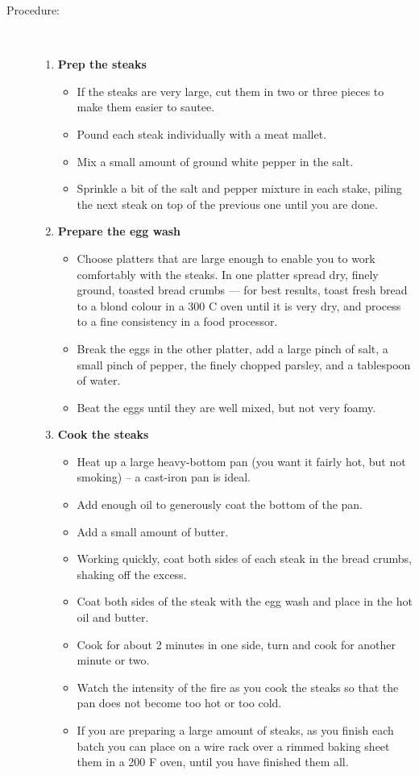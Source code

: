 \documentclass[11pt,letterpaper]{article}
\begin{document}
\begin{description}
\item[Procedure:]\ \\
	\begin{enumerate}
	\item {\bf Prep the steaks}
	\begin{itemize}
	\item If the steaks are very large, cut them in two or three pieces to make them easier to sautee.
	\item Pound each steak individually with a meat mallet.
	\item Mix a small amount of ground white pepper in the salt.
	\item Sprinkle a bit of the salt and pepper mixture in each stake, piling the next steak on top of the previous one until you are done.
	\end{itemize}
	\item {\bf Prepare the egg wash}
	\begin{itemize}
	\item Choose platters that are large enough to enable you to work comfortably with the steaks. In one platter spread dry, finely ground, toasted bread crumbs --- for best results, toast fresh bread to a blond colour in a 300 C oven until it is very dry, and process to a fine consistency in a food processor.
	\item Break the eggs in the other platter, add a large pinch of salt, a small pinch of pepper, the finely chopped parsley, and a tablespoon of water. 
	\item Beat the eggs until they are well mixed, but not very foamy.
	\end{itemize}
	\item {\bf Cook the steaks}
	\begin{itemize}
	\item Heat up a large heavy-bottom pan (you want it fairly hot, but not smoking) -- a cast-iron pan is ideal.
	\item Add enough oil to generously coat the bottom of the pan.
	\item Add a small amount of butter.
	\item Working quickly, coat both sides of each steak in the bread crumbs, shaking off the excess.
	\item Coat both sides of the steak with the egg wash and place in the hot oil and butter.
	\item Cook for about 2 minutes in one side, turn and cook for another minute or two.
	\item Watch the intensity of the fire as you cook the steaks so that the pan does not become too hot or too cold.
	\item If you are preparing a large amount of steaks, as you finish each batch you can place on a wire rack over a rimmed baking sheet them in a 200 F oven, until you have finished them all.
	\end{itemize}
	\end{enumerate}
\end{description}
\end{document}
